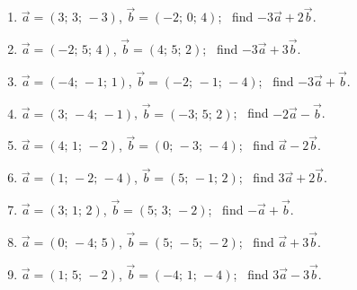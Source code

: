 \begin{enumerate}[label=\arabic*., leftmargin=*]
\item $\vec a=(3;\,3;\,-3)$, $\vec b=(-2;\,0;\,4)$; \ find $-3\vec a+2\vec b$.
\item $\vec a=(-2;\,5;\,4)$, $\vec b=(4;\,5;\,2)$; \ find $-3\vec a+3\vec b$.
\item $\vec a=(-4;\,-1;\,1)$, $\vec b=(-2;\,-1;\,-4)$; \ find $-3\vec a+\vec b$.
\item $\vec a=(3;\,-4;\,-1)$, $\vec b=(-3;\,5;\,2)$; \ find $-2\vec a-\vec b$.
\item $\vec a=(4;\,1;\,-2)$, $\vec b=(0;\,-3;\,-4)$; \ find $\vec a-2\vec b$.
\item $\vec a=(1;\,-2;\,-4)$, $\vec b=(5;\,-1;\,2)$; \ find $3\vec a+2\vec b$.
\item $\vec a=(3;\,1;\,2)$, $\vec b=(5;\,3;\,-2)$; \ find $-\vec a+\vec b$.
\item $\vec a=(0;\,-4;\,5)$, $\vec b=(5;\,-5;\,-2)$; \ find $\vec a+3\vec b$.
\item $\vec a=(1;\,5;\,-2)$, $\vec b=(-4;\,1;\,-4)$; \ find $3\vec a-3\vec b$.
\end{enumerate}

